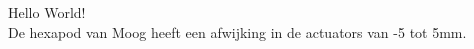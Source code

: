 \documentclass[11pt]{article}
\begin{document}
Hello World!\\
De hexapod van Moog heeft een afwijking in de actuators van -5 tot 5mm.
\end{document}
